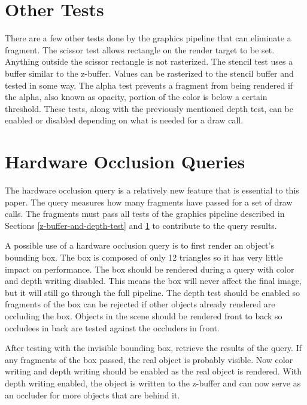 \documentclass[12pt]{ucthesis}
\begin{document}
\section{Other Tests}
\label{other-tests}

There are a few other tests done by the graphics pipeline that can eliminate a fragment.\cite{GpuGem-Occlusion}
The scissor test allows rectangle on the render target to be set.
Anything outside the scissor rectangle is not rasterized.
The stencil test uses a buffer similar to the z-buffer.\cite{d3d11-pipeline}
Values can be rasterized to the stencil buffer and tested in some way.
The alpha test prevents a fragment from being rendered if the alpha, also known as opacity, portion of the color is below a certain threshold.
These tests, along with the previously mentioned depth test, can be enabled or disabled depending on what is needed for a draw call.

\section{Hardware Occlusion Queries}
\label{hardware-occlusion-queries}

The hardware occlusion query is a relatively new feature that is essential to this paper.
The query measures how many fragments have passed for a set of draw calls.
The fragments must pass all tests of the graphics pipeline described in Sections \ref{z-buffer-and-depth-test} and \ref{other-tests} to contribute to the query results.

A possible use of a hardware occlusion query is to first render an object's bounding box.
The box is composed of only 12 triangles so it has very little impact on performance.
The box should be rendered during a query with color and depth writing disabled.
This means the box will never affect the final image, but it will still go through the full pipeline.
The depth test should be enabled so fragments of the box can be rejected if other objects already rendered are occluding the box.
Objects in the scene should be rendered front to back so occludees in back are tested against the occluders in front.

After testing with the invisible bounding box, retrieve the results of the query.
If any fragments of the box passed, the real object is probably visible.
Now color writing and depth writing should be enabled as the real object is rendered.
With depth writing enabled, the object is written to the z-buffer and can now serve as an occluder for more objects that are behind it.
\end{document}
